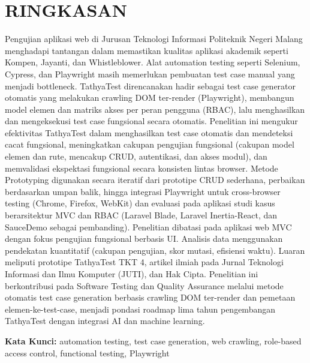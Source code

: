 \chapter*{RINGKASAN}

Pengujian aplikasi web di Jurusan Teknologi Informasi Politeknik Negeri Malang menghadapi tantangan dalam memastikan kualitas aplikasi akademik seperti Kompen, Jayanti, dan Whistleblower. Alat automation testing seperti Selenium, Cypress, dan Playwright masih memerlukan pembuatan test case manual yang menjadi bottleneck. TathyaTest direncanakan hadir sebagai test case generator otomatis yang melakukan crawling DOM ter-render (Playwright), membangun model elemen dan matriks akses per peran pengguna (RBAC), lalu menghasilkan dan mengeksekusi test case fungsional secara otomatis. Penelitian ini mengukur efektivitas TathyaTest dalam menghasilkan test case otomatis dan mendeteksi cacat fungsional, meningkatkan cakupan pengujian fungsional (cakupan model elemen dan rute, mencakup CRUD, autentikasi, dan akses modul), dan memvalidasi ekspektasi fungsional secara konsisten lintas browser. Metode Prototyping digunakan secara iteratif dari prototipe CRUD sederhana, perbaikan berdasarkan umpan balik, hingga integrasi Playwright untuk cross-browser testing (Chrome, Firefox, WebKit) dan evaluasi pada aplikasi studi kasus berarsitektur MVC dan RBAC (Laravel Blade, Laravel Inertia-React, dan SauceDemo sebagai pembanding). Penelitian dibatasi pada aplikasi web MVC dengan fokus pengujian fungsional berbasis UI. Analisis data menggunakan pendekatan kuantitatif (cakupan pengujian, skor mutasi, efisiensi waktu). Luaran meliputi prototipe TathyaTest TKT 4, artikel ilmiah pada Jurnal Teknologi Informasi dan Ilmu Komputer (JUTI), dan Hak Cipta. Penelitian ini berkontribusi pada Software Testing dan Quality Assurance melalui metode otomatis test case generation berbasis crawling DOM ter-render dan pemetaan elemen-ke-test-case, menjadi pondasi roadmap lima tahun pengembangan TathyaTest dengan integrasi AI dan machine learning.

\vspace{0.5cm}

\noindent
\textbf{Kata Kunci:} automation testing, test case generation, web crawling, role-based access control, functional testing, Playwright
